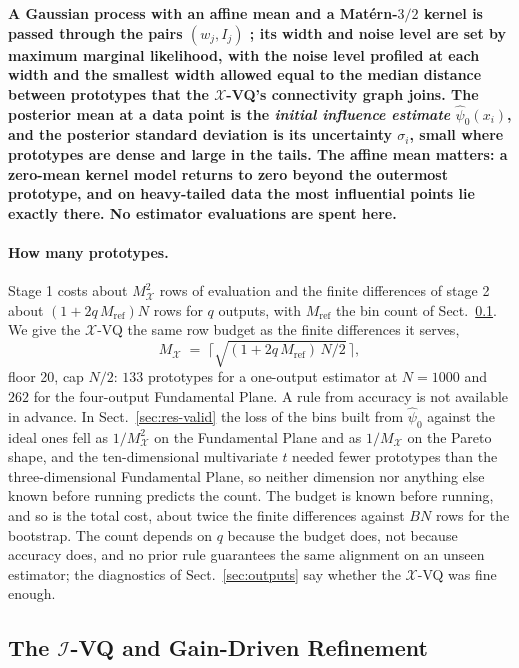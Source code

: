 \documentclass[runningheads]{llncs}
\newif\ifrev \revtrue
\newcommand{\rev}[1]{\ifrev{\color{blue}\bfseries #1}\else#1\fi}
\newcommand{\XVQ}{\ensuremath{\mathcal{X}}-VQ}
\newcommand{\MX}{M_{\mathcal{X}}}
\newcommand{\psinull}{\hat{\psi}_0}
\begin{document}
\rev{A Gaussian process with an affine mean and a Mat\'ern-$3/2$ kernel is passed through the pairs $(w_j, I_j)$ \cite{rasmussen2006}; its width and noise level are set by maximum marginal likelihood, with the noise level profiled at each width and the smallest width allowed equal to the median distance between prototypes that the \XVQ's connectivity graph joins. The posterior mean at a data point is the \emph{initial influence estimate} $\psinull(x_i)$, and the posterior standard deviation is its uncertainty $\sigma_i$, small where prototypes are dense and large in the tails. The affine mean matters: a zero-mean kernel model returns to zero beyond the outermost prototype, and on heavy-tailed data the most influential points lie exactly there. No estimator evaluations are spent here.}

\rev{\paragraph{How many prototypes.} Stage 1 costs about $\MX^2$ rows of evaluation and the finite differences of stage 2 about $(1 + 2q\,M_{\mathrm{ref}})N$ rows for $q$ outputs, with $M_{\mathrm{ref}}$ the bin count of Sect.~\ref{sec:ivq}. We give the \XVQ{} the same row budget as the finite differences it serves,
\begin{equation}\label{eq:MX}
\MX \;=\; \Big\lceil \sqrt{(1 + 2q\,M_{\mathrm{ref}})\,N/2}\,\Big\rceil,
\end{equation}
floor 20, cap $N/2$: $133$ prototypes for a one-output estimator at $N = 1000$ and $262$ for the four-output Fundamental Plane. A rule from accuracy is not available in advance. In Sect.~\ref{sec:res-valid} the loss of the bins built from $\psinull$ against the ideal ones fell as $1/\MX^2$ on the Fundamental Plane and as $1/\MX$ on the Pareto shape, and the ten-dimensional multivariate $t$ needed fewer prototypes than the three-dimensional Fundamental Plane, so neither dimension nor anything else known before running predicts the count. The budget is known before running, and so is the total cost, about twice the finite differences against $BN$ rows for the bootstrap. The count depends on $q$ because the budget does, not because accuracy does, and no prior rule guarantees the same alignment on an unseen estimator; the diagnostics of Sect.~\ref{sec:outputs} say whether the \XVQ{} was fine enough.}

\subsection{The $\mathcal{I}$-VQ and Gain-Driven Refinement}\label{sec:ivq}
\end{document}
